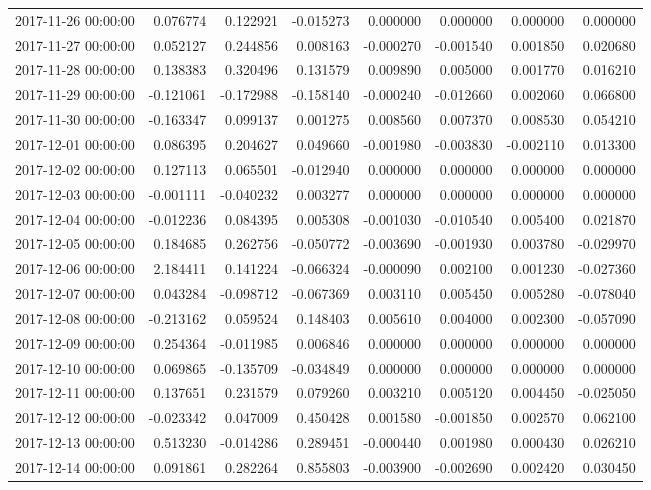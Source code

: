 \begin{tabular}{lrrrrrrr}
2017-11-26 00:00:00 & 0.076774 & 0.122921 & -0.015273 & 0.000000 & 0.000000 & 0.000000 & 0.000000 \\
2017-11-27 00:00:00 & 0.052127 & 0.244856 & 0.008163 & -0.000270 & -0.001540 & 0.001850 & 0.020680 \\
2017-11-28 00:00:00 & 0.138383 & 0.320496 & 0.131579 & 0.009890 & 0.005000 & 0.001770 & 0.016210 \\
2017-11-29 00:00:00 & -0.121061 & -0.172988 & -0.158140 & -0.000240 & -0.012660 & 0.002060 & 0.066800 \\
2017-11-30 00:00:00 & -0.163347 & 0.099137 & 0.001275 & 0.008560 & 0.007370 & 0.008530 & 0.054210 \\
2017-12-01 00:00:00 & 0.086395 & 0.204627 & 0.049660 & -0.001980 & -0.003830 & -0.002110 & 0.013300 \\
2017-12-02 00:00:00 & 0.127113 & 0.065501 & -0.012940 & 0.000000 & 0.000000 & 0.000000 & 0.000000 \\
2017-12-03 00:00:00 & -0.001111 & -0.040232 & 0.003277 & 0.000000 & 0.000000 & 0.000000 & 0.000000 \\
2017-12-04 00:00:00 & -0.012236 & 0.084395 & 0.005308 & -0.001030 & -0.010540 & 0.005400 & 0.021870 \\
2017-12-05 00:00:00 & 0.184685 & 0.262756 & -0.050772 & -0.003690 & -0.001930 & 0.003780 & -0.029970 \\
2017-12-06 00:00:00 & 2.184411 & 0.141224 & -0.066324 & -0.000090 & 0.002100 & 0.001230 & -0.027360 \\
2017-12-07 00:00:00 & 0.043284 & -0.098712 & -0.067369 & 0.003110 & 0.005450 & 0.005280 & -0.078040 \\
2017-12-08 00:00:00 & -0.213162 & 0.059524 & 0.148403 & 0.005610 & 0.004000 & 0.002300 & -0.057090 \\
2017-12-09 00:00:00 & 0.254364 & -0.011985 & 0.006846 & 0.000000 & 0.000000 & 0.000000 & 0.000000 \\
2017-12-10 00:00:00 & 0.069865 & -0.135709 & -0.034849 & 0.000000 & 0.000000 & 0.000000 & 0.000000 \\
2017-12-11 00:00:00 & 0.137651 & 0.231579 & 0.079260 & 0.003210 & 0.005120 & 0.004450 & -0.025050 \\
2017-12-12 00:00:00 & -0.023342 & 0.047009 & 0.450428 & 0.001580 & -0.001850 & 0.002570 & 0.062100 \\
2017-12-13 00:00:00 & 0.513230 & -0.014286 & 0.289451 & -0.000440 & 0.001980 & 0.000430 & 0.026210 \\
2017-12-14 00:00:00 & 0.091861 & 0.282264 & 0.855803 & -0.003900 & -0.002690 & 0.002420 & 0.030450 \\

\end{tabular}
